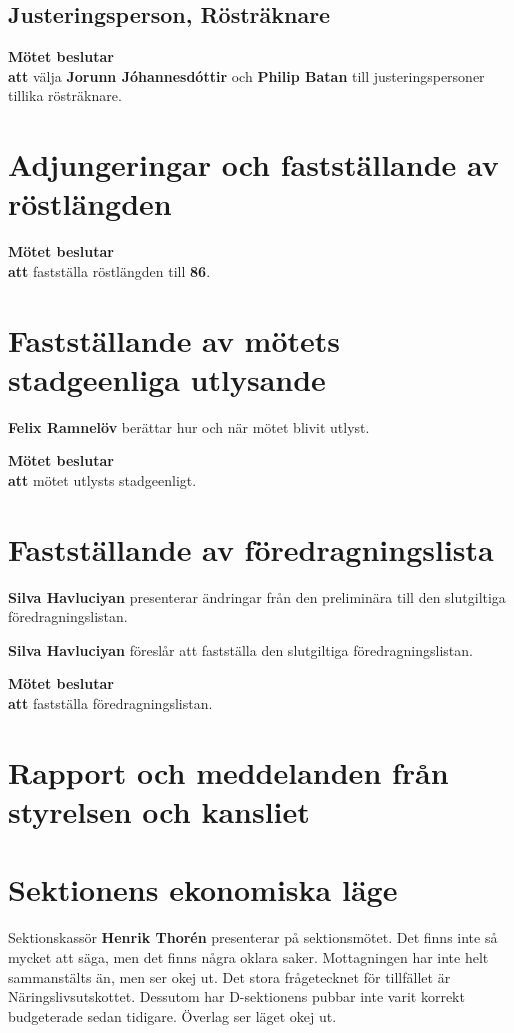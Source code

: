 \documentclass{datateknologsektionen-document}
\newcommand{\ind}{\hspace*{2em}}
\newcommand{\motetbeslutar}{\textbf{Mötet beslutar}}
\newcommand{\att}{\\\ind\textbf{att}}
\begin{document}
\subsection{Justeringsperson, Rösträknare}
\motetbeslutar\att{} välja \textbf{Jorunn Jóhannesdóttir} och \textbf{Philip Batan} till justeringspersoner tillika rösträknare.


\section{Adjungeringar och fastställande av röstlängden}



\motetbeslutar
\att{} fastställa röstlängden till \textbf{86}.



\section{Fastställande av mötets stadgeenliga utlysande}
\textbf{Felix Ramnelöv} berättar hur och när mötet blivit utlyst.

\motetbeslutar
\att{} mötet utlysts stadgeenligt.



\pagebreak
\section{Fastställande av föredragningslista}
\textbf{Silva Havluciyan} presenterar ändringar från den preliminära till den slutgiltiga föredragningslistan.

\textbf{Silva Havluciyan} föreslår att fastställa den slutgiltiga föredragningslistan.

\motetbeslutar\att{} fastställa föredragningslistan.


\section{Rapport och meddelanden från styrelsen och kansliet}




\pagebreak
\section{Sektionens ekonomiska läge}
Sektionskassör \textbf{Henrik Thorén} presenterar på sektionsmötet. Det finns inte så mycket att säga, men det finns några oklara saker. Mottagningen har inte helt sammanstälts än, men ser okej ut. Det stora frågetecknet för tillfället är Näringslivsutskottet. Dessutom har D-sektionens pubbar inte varit korrekt budgeterade sedan tidigare. Överlag ser läget okej ut.
\end{document}

